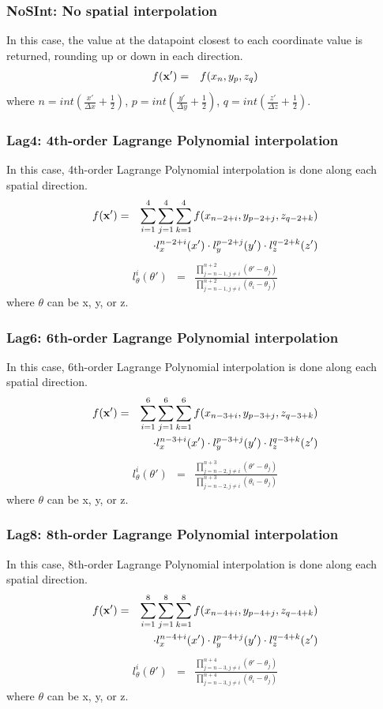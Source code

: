 \documentclass[11pt]{article}
\def\bea{\begin{eqnarray}}
\def\eea{\end{eqnarray}}
\begin{document}
\subsubsection*{NoSInt: No spatial  interpolation}
\label{sec-noint}
In this case, the value at the datapoint closest to each
coordinate value is returned, rounding up or down in each
direction. \bea f({\bf x'}) &=& f(x_n,y_p,z_q)\eea where
$n=int(\frac{x'}{\Delta x}+\frac{1}{2})$, $p=int(\frac{y'}{\Delta
y}+\frac{1}{2})$, $q=int(\frac{z'}{\Delta z}+\frac{1}{2})$.

\subsubsection*{Lag4: 4th-order Lagrange Polynomial interpolation}

In this case, 4th-order Lagrange Polynomial interpolation is done along each spatial direction.
\bea f({\bf x'}) &=&
\sum_{i=1}^4\sum_{j=1}^4\sum_{k=1}^4f(x_{n-2+i},y_{p-2+j},z_{q-2+k})\nonumber\\
&&\cdot l_x^{n-2+i}(x')\cdot l_y^{p-2+j}(y')\cdot
l_z^{q-2+k}(z')\eea \bea l_\theta^i(\theta') &=&
\frac{\prod\limits_{j=n-1,j\neq
i}^{n+2}(\theta'-\theta_j)}{\prod\limits_{j=n-1,j\neq
i}^{n+2}(\theta_i-\theta_j)}\eea where $\theta$ can be x, y, or z.

\subsubsection*{Lag6: 6th-order Lagrange Polynomial interpolation}

In this case, 6th-order Lagrange Polynomial interpolation is done along each spatial direction.
\bea f({\bf x'}) &=&
\sum_{i=1}^6\sum_{j=1}^6\sum_{k=1}^6f(x_{n-3+i},y_{p-3+j},z_{q-3+k})\nonumber\\
&&\cdot l_x^{n-3+i}(x')\cdot l_y^{p-3+j}(y')\cdot
l_z^{q-3+k}(z')\eea \bea l_\theta^i(\theta') &=&
\frac{\prod\limits_{j=n-2,j\neq
i}^{n+3}(\theta'-\theta_j)}{\prod\limits_{j=n-2,j\neq
i}^{n+3}(\theta_i-\theta_j)}\eea where $\theta$ can be x, y, or z.

\subsubsection*{Lag8: 8th-order Lagrange Polynomial interpolation}

In this case, 8th-order Lagrange Polynomial interpolation is done along each spatial direction.
\bea f({\bf x'}) &=&
\sum_{i=1}^8\sum_{j=1}^8\sum_{k=1}^8f(x_{n-4+i},y_{p-4+j},z_{q-4+k})\nonumber\\
&&\cdot l_x^{n-4+i}(x')\cdot l_y^{p-4+j}(y')\cdot
l_z^{q-4+k}(z')\eea \bea l_\theta^i(\theta') &=&
\frac{\prod\limits_{j=n-3,j\neq
i}^{n+4}(\theta'-\theta_j)}{\prod\limits_{j=n-3,j\neq
i}^{n+4}(\theta_i-\theta_j)}\eea where $\theta$ can be x, y, or z.
\end{document}
